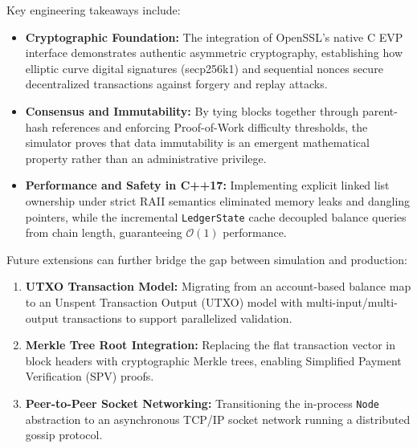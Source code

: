 \documentclass[11pt,a4paper]{report}
\begin{document}
Key engineering takeaways include:
\begin{itemize}
    \item \textbf{Cryptographic Foundation:} The integration of OpenSSL's native C EVP interface demonstrates authentic asymmetric cryptography, establishing how elliptic curve digital signatures (secp256k1) and sequential nonces secure decentralized transactions against forgery and replay attacks.
    \item \textbf{Consensus and Immutability:} By tying blocks together through parent-hash references and enforcing Proof-of-Work difficulty thresholds, the simulator proves that data immutability is an emergent mathematical property rather than an administrative privilege.
    \item \textbf{Performance and Safety in C++17:} Implementing explicit linked list ownership under strict RAII semantics eliminated memory leaks and dangling pointers, while the incremental \texttt{LedgerState} cache decoupled balance queries from chain length, guaranteeing $\mathcal{O}(1)$ performance.
\end{itemize}

Future extensions can further bridge the gap between simulation and production:
\begin{enumerate}
    \item \textbf{UTXO Transaction Model:} Migrating from an account-based balance map to an Unspent Transaction Output (UTXO) model with multi-input/multi-output transactions to support parallelized validation.
    \item \textbf{Merkle Tree Root Integration:} Replacing the flat transaction vector in block headers with cryptographic Merkle trees, enabling Simplified Payment Verification (SPV) proofs.
    \item \textbf{Peer-to-Peer Socket Networking:} Transitioning the in-process \texttt{Node} abstraction to an asynchronous TCP/IP socket network running a distributed gossip protocol.
\end{enumerate}
\end{document}
